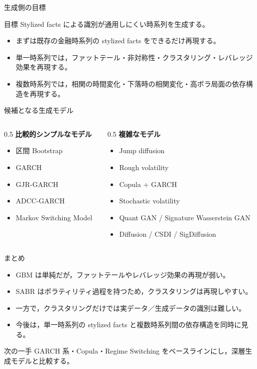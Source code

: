 \documentclass[aspectratio=169,11pt]{beamer}
\begin{document}
\begin{frame}{生成側の目標}
\begin{block}{目標}
Stylized facts による識別が通用しにくい時系列を生成する。
\end{block}
\begin{itemize}
  \item まずは既存の金融時系列の stylized facts をできるだけ再現する。
  \item 単一時系列では，ファットテール・非対称性・クラスタリング・レバレッジ効果を再現する。
  \item 複数時系列では，相関の時間変化・下落時の相関変化・高ボラ局面の依存構造を再現する。
\end{itemize}
\end{frame}

\begin{frame}{候補となる生成モデル}
\begin{columns}[T]
\begin{column}{0.5\textwidth}
\textbf{比較的シンプルなモデル}
\begin{itemize}
  \item 区間 Bootstrap
  \item GARCH
  \item GJR-GARCH
  \item ADCC-GARCH
  \item Markov Switching Model
\end{itemize}
\end{column}
\begin{column}{0.5\textwidth}
\textbf{複雑なモデル}
\begin{itemize}
  \item Jump diffusion
  \item Rough volatility
  \item Copula + GARCH
  \item Stochastic volatility
  \item Quant GAN / Signature Wasserstein GAN
  \item Diffusion / CSDI / SigDiffusion
\end{itemize}
\end{column}
\end{columns}
\end{frame}

\begin{frame}{まとめ}
\begin{itemize}
  \item GBM は単純だが，ファットテールやレバレッジ効果の再現が弱い。
  \item SABR はボラティリティ過程を持つため，クラスタリングは再現しやすい。
  \item 一方で，クラスタリングだけでは実データ／生成データの識別は難しい。
  \item 今後は，単一時系列の stylized facts と複数時系列間の依存構造を同時に見る。
\end{itemize}
\begin{block}{次の一手}
GARCH 系・Copula・Regime Switching をベースラインにし，深層生成モデルと比較する。
\end{block}
\end{frame}
\end{document}
